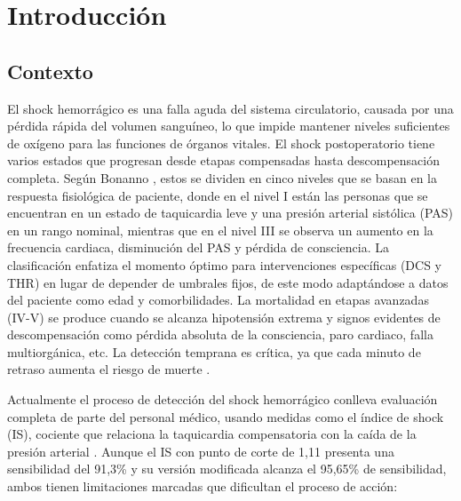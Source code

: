 \section{Introducción}

\subsection{Contexto}

El shock hemorrágico es una falla aguda del sistema circulatorio, causada por una pérdida rápida del volumen sanguíneo, lo que impide mantener niveles suficientes de oxígeno para las funciones de órganos vitales. El shock postoperatorio tiene varios estados que progresan desde etapas compensadas hasta descompensación completa. Según Bonanno \cite{bonanno2023}, estos se dividen en cinco niveles que se basan en la respuesta fisiológica de paciente, donde en el nivel I están las personas que se encuentran en un estado de taquicardia leve y una presión arterial sistólica (PAS) en un rango nominal, mientras que en el nivel III se observa un aumento en la frecuencia cardiaca, disminución del PAS y pérdida de consciencia. La clasificación enfatiza el momento óptimo para intervenciones específicas (DCS y THR) en lugar de depender de umbrales fijos, de este modo adaptándose a datos del paciente como edad y comorbilidades. La mortalidad en etapas avanzadas (IV-V) se produce cuando se alcanza hipotensión extrema y signos evidentes de descompensación como pérdida absoluta de la consciencia, paro cardiaco, falla multiorgánica, etc. La detección temprana es crítica, ya que cada minuto de retraso aumenta el riesgo de muerte \cite{cannon2018}.

Actualmente el proceso de detección del shock hemorrágico conlleva evaluación completa de parte del personal médico, usando medidas como el índice de shock (IS), cociente que relaciona la taquicardia compensatoria con la caída de la presión arterial \cite{terceros2017}. Aunque el IS con punto de corte de 1,11 presenta una sensibilidad del 91,3\% y su versión modificada alcanza el 95,65\% de sensibilidad, ambos tienen limitaciones marcadas que dificultan el proceso de acción:

